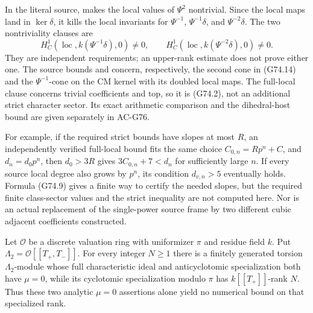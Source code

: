 In the literal source,  makes the local values
of \(\Psi^2\) nontrivial.  Since the local maps land in
\(\ker\delta\), it kills the local invariants for
\(\Psi^{-1}\), \(\Psi^{-1}\delta\), and
\(\Psi^{-2}\delta\).  The two nontriviality clauses are
\[
 H^1_C(\operatorname{loc},k(\Psi^{-1}\delta),0)\ne0,\qquad
 H^1_C(\operatorname{loc},k(\Psi^{-2}\delta),0)\ne0.
                                                               \tag{G74.14}
\]
They are independent requirements; an upper-rank estimate does
not prove either one.  The source bounds
 and  concern, respectively,
the second cone in (G74.14) and the
\(\Psi^{-1}\)-cone on the CM kernel with its doubled local maps.
The full-local clause  concerns trivial
coefficients and \(\mathrm{top}\), so it is (G74.2), not an
additional strict character sector.  Its exact arithmetic
comparison and the dihedral-host bound are given separately
in AC-G76.

For example, if the required strict bounds have slopes at most
\(R\), an independently verified full-local bound fits the same
choice \(C_{0,n}=Rp^n+C\), and \(d_n=d_0p^n\), then
\(d_0>3R\) gives \(3C_{0,n}+7<d_n\) for sufficiently large \(n\).
If every source local degree also grows by \(p^n\), its condition
\(d_{v,n}>5\) eventually holds.  Formula (G74.9) gives a finite
way to certify the needed slopes, but the required finite
class-sector values and the strict inequality are not computed
here.  Nor is an actual replacement of the single-power source
frame by two different cubic adjacent coefficients constructed.

\begin{proposition}
\label{prop:ACG74specialization}
Let \(\mathcal O\) be a discrete valuation ring with uniformizer
\(\pi\) and residue field \(k\).  Put
\(\Lambda_2=\mathcal O[[T_+,T_-]]\).  For every integer \(N\geq1\)
there is a finitely generated torsion \(\Lambda_2\)-module whose
full characteristic ideal and anticyclotomic specialization both
have \(\mu=0\), while its cyclotomic specialization modulo \(\pi\)
has \(k[[T_+]]\)-rank \(N\).
Thus these two analytic \(\mu=0\) assertions alone yield no
numerical bound on that specialized rank.
\end{proposition}

